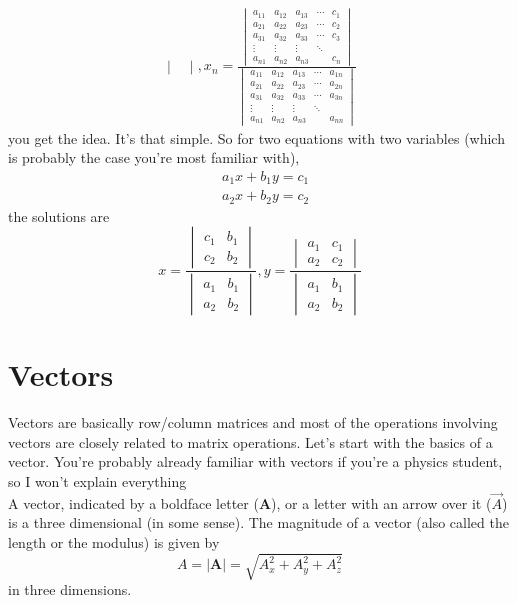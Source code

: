 \documentclass[oneside]{book}
\numberwithin{equation}{chapter} %
\begin{document}
\begin{align*}
{\begin{vmatrix}
\end{vmatrix}},x_n=\frac{\begin{vmatrix}
		a_{11}&a_{12}&a_{13}&\cdots&c_1\\a_{21}&a_{22}&a_{23}&\cdots&c_2\\a_{31}&a_{32}&a_{33}&\cdots&c_3\\\vdots&\vdots&\vdots&\ddots&\\a_{n1}&a_{n2}&a_{n3}&&c_n
\end{vmatrix}}{\begin{vmatrix}
		a_{11}&a_{12}&a_{13}&\cdots&a_{1n}\\a_{21}&a_{22}&a_{23}&\cdots&a_{2n}\\a_{31}&a_{32}&a_{33}&\cdots&a_{3n}\\\vdots&\vdots&\vdots&\ddots&\\a_{n1}&a_{n2}&a_{n3}&&a_{nn}
\end{vmatrix}}
\end{align*}
you get the idea. It's that simple. So for two equations with two variables (which is probably the case you're most familiar with),
\begin{align*}
	&a_1x+b_1y=c_1\\
	&a_2x+b_2y=c_2
\end{align*}
the solutions are 
$$
x=\frac{\begin{vmatrix}
		c_1&b_1\\c_2&b_2
\end{vmatrix}}{\begin{vmatrix}
a_1&b_1\\a_2&b_2
\end{vmatrix}}, y=\frac{\begin{vmatrix}
a_1&c_1\\a_2&c_2
\end{vmatrix}}{\begin{vmatrix}
a_1&b_1\\a_2&b_2
\end{vmatrix}}
$$
\section{Vectors}
Vectors are basically row/column matrices and most of the operations involving vectors are closely related to matrix operations. Let's start with the basics of a vector. You're probably already familiar with vectors if you're a physics student, so I won't explain everything\\

A vector, indicated by a boldface letter ($\mathbf A$), or a letter with an arrow over it ($\vec A$) is a three dimensional  (in some sense). The magnitude of a vector (also called the length or the modulus) is given by 
$$A=|\mathbf{A}|=\sqrt{A_x^2+A_y^2+A_z^2}$$
in three dimensions. 
\end{document}
